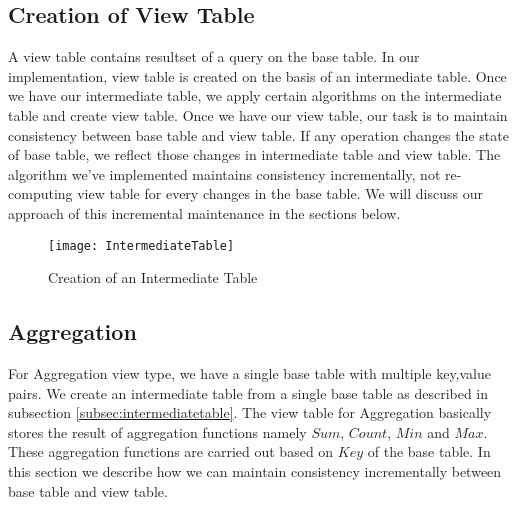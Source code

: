 \documentclass[11pt,a4paper,bibtotoc,idxtotoc,headsepline,footsepline,footexclude,BCOR12mm,DIV13]{scrbook}
\begin{document}
\subsection{Creation of View Table}
A view table contains resultset of a query on the base table. In our implementation, view table is created on the basis of an intermediate table. Once we have our intermediate table, we apply certain algorithms on the intermediate table and create view table. Once we have our view table, our task is to maintain consistency between base table and view table. If any operation changes the state of base table, we reflect those changes in intermediate table and view table. The algorithm we've implemented maintains consistency incrementally, not re-computing view table for every changes in the base table. We will discuss our approach of this incremental maintenance in the sections below.

\begin{figure}
    \centering
    \texttt{[image: IntermediateTable]}
    \caption{Creation of an Intermediate Table}
    \label{Intermediate Table}
    
\end{figure}

\newpage
\subsection{Aggregation}
\label{sec:aggregationImpl}

For Aggregation view type, we have a single base table with multiple key,value pairs. We create an intermediate table from a single base table as described in subsection \ref{subsec:intermediatetable}. The view table for Aggregation basically stores the result of aggregation functions namely $Sum$, $Count$, $Min$ and $Max$. These aggregation functions are carried out based on $Key$ of the base table. In this section we describe how we can maintain consistency incrementally between base table and view table. 

\end{document}
